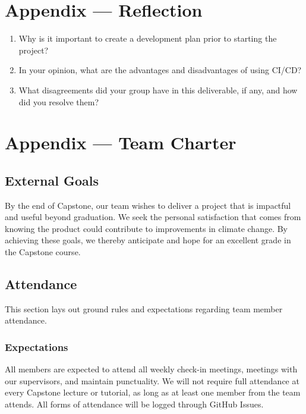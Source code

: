 \documentclass{article}
\begin{document}
\newpage{}

\section*{Appendix --- Reflection}




\begin{enumerate}
    \item Why is it important to create a development plan prior to starting the
    project?
    \item In your opinion, what are the advantages and disadvantages of using
    CI/CD?
    \item What disagreements did your group have in this deliverable, if any,
    and how did you resolve them?
\end{enumerate}

\newpage{}

\section*{Appendix --- Team Charter \cite{ref1}}

\subsection*{External Goals}

By the end of Capstone, our team wishes to deliver a project that is impactful
and useful beyond graduation. We seek the personal satisfaction that comes from
knowing the product could contribute to improvements in climate change. By achieving 
these goals, we thereby anticipate and hope for an excellent grade in the Capstone
course.

\subsection*{Attendance}

This section lays out ground rules and expectations regarding team member attendance.

\subsubsection*{Expectations}

All members are expected to attend all weekly check-in meetings, meetings with our
supervisors, and maintain punctuality. We will not require full attendance at every
Capstone lecture or tutorial, as long as at least one member from the team attends.
All forms of attendance will be logged through GitHub Issues.
\end{document}
